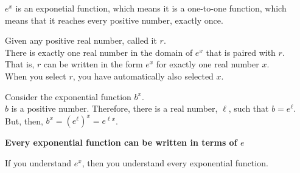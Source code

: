 \documentclass{ximera}
\begin{document}
$e^x$ is an exponetial function, which means it is a one-to-one function, which means that it reaches every positive number, exactly once. \\


\begin{observation}


Given any positive real number, called it $r$. \\

There is exactly one real number in the domain of $e^x$ that is paired with $r$. \\


That is, $r$ can be written in the form $e^x$ for exactly one real number $x$.  \\


When you select $r$, you have automatically also selected $x$.


\end{observation}








\begin{conclusion}


Consider the exponential function $b^x$. \\

$b$ is a positive number.  Therefore, there is a real number, $\ell$, such that $b = e^{\ell}$. \\


But, then, $b^x = \left( e^{\ell} \right)^x = e^{\ell x}$.


\begin{center}
\textbf{\textcolor{red!70!black}{Every exponential function can be written in terms of $e$}}
\end{center}



If you understand $e^x$, then you understand every exponential function.

\end{conclusion}
\end{document}
